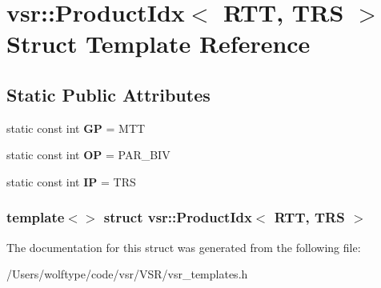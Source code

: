 \hypertarget{structvsr_1_1_product_idx_3_01_r_t_t_00_01_t_r_s_01_4}{\section{vsr\-:\-:Product\-Idx$<$ R\-T\-T, T\-R\-S $>$ Struct Template Reference}
\label{structvsr_1_1_product_idx_3_01_r_t_t_00_01_t_r_s_01_4}
}
\subsection*{Static Public Attributes}
\begin{DoxyCompactItemize}
\item 
\hypertarget{structvsr_1_1_product_idx_3_01_r_t_t_00_01_t_r_s_01_4_a6b40807d0165b21777fe162d94e49878}{static const int {\bfseries G\-P} = M\-T\-T}\label{structvsr_1_1_product_idx_3_01_r_t_t_00_01_t_r_s_01_4_a6b40807d0165b21777fe162d94e49878}

\item 
\hypertarget{structvsr_1_1_product_idx_3_01_r_t_t_00_01_t_r_s_01_4_acb46721229274b08edcbcf38bdbaebb9}{static const int {\bfseries O\-P} = P\-A\-R\-\_\-\-B\-I\-V}\label{structvsr_1_1_product_idx_3_01_r_t_t_00_01_t_r_s_01_4_acb46721229274b08edcbcf38bdbaebb9}

\item 
\hypertarget{structvsr_1_1_product_idx_3_01_r_t_t_00_01_t_r_s_01_4_a6c037a92e9309e85ddc8bb8549821a16}{static const int {\bfseries I\-P} = T\-R\-S}\label{structvsr_1_1_product_idx_3_01_r_t_t_00_01_t_r_s_01_4_a6c037a92e9309e85ddc8bb8549821a16}

\end{DoxyCompactItemize}
\subsubsection*{template$<$$>$ struct vsr\-::\-Product\-Idx$<$ R\-T\-T, T\-R\-S $>$}



The documentation for this struct was generated from the following file\-:\begin{DoxyCompactItemize}
\item 
/\-Users/wolftype/code/vsr/\-V\-S\-R/vsr\-\_\-templates.\-h\end{DoxyCompactItemize}
